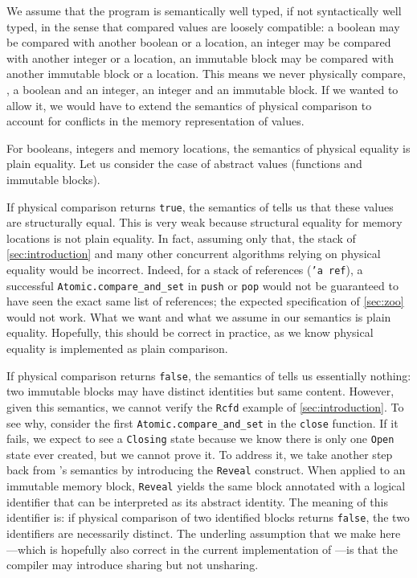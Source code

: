 We assume that the program is semantically well typed, if not syntactically well typed, in the sense that compared values are loosely compatible: a boolean may be compared with another boolean or a location, an integer may be compared with another integer or a location, an immutable block may be compared with another immutable block or a location.
This means we never physically compare, \eg, a boolean and an integer, an integer and an immutable block.
If we wanted to allow it, we would have to extend the semantics of physical comparison to account for conflicts in the memory representation of values.

For booleans, integers and memory locations, the semantics of physical equality is plain equality.
Let us consider the case of abstract values (functions and immutable blocks).

If physical comparison returns \texttt{true}, the semantics of \OCaml tells us that these values are structurally equal.
This is very weak because structural equality for memory locations is not plain equality.
In fact, assuming only that, the stack of \cref{sec:introduction} and many other concurrent algorithms relying on physical equality would be incorrect.
Indeed, for \eg a stack of references (\texttt{'a ref}), a successful \texttt{Atomic.compare_and_set} in \texttt{push} or \texttt{pop} would not be guaranteed to have seen the exact same list of references; the expected specification of \cref{sec:zoo} would not work.
What we want and what we assume in our semantics is plain equality.
Hopefully, this should be correct in practice, as we know physical equality is implemented as plain comparison.

If physical comparison returns \texttt{false}, the semantics of \OCaml tells us essentially nothing: two immutable blocks may have distinct identities but same content.
However, given this semantics, we cannot verify the \texttt{Rcfd} example of \cref{sec:introduction}.
To see why, consider the first \texttt{Atomic.compare_and_set} in the \texttt{close} function.
If it fails, we expect to see a \texttt{Closing} state because we know there is only one \texttt{Open} state ever created, but we cannot prove it.
To address it, we take another step back from \OCaml's semantics by introducing the \texttt{Reveal} construct.
When applied to an immutable memory block, \texttt{Reveal} yields the same block annotated with a logical identifier that can be interpreted as its abstract identity.
The meaning of this identifier is: if physical comparison of two identified blocks returns \texttt{false}, the two identifiers are necessarily distinct.
The underling assumption that we make here---which is hopefully also correct in the current implementation of \OCaml---is that the compiler may introduce sharing but not unsharing.

